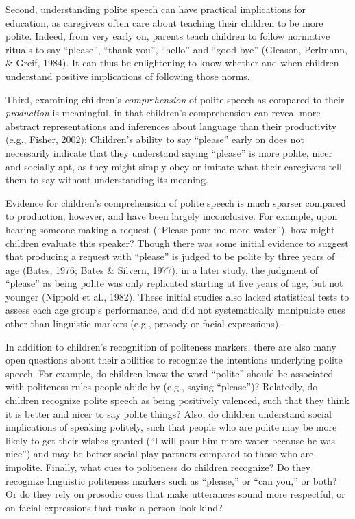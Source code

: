 \documentclass[10pt, letterpaper]{article}
\begin{document}
Second, understanding polite speech can have practical implications for
education, as caregivers often care about teaching their children to be
more polite. Indeed, from very early on, parents teach children to
follow normative rituals to say ``please'', ``thank you'', ``hello'' and
``good-bye'' (Gleason, Perlmann, \& Greif, 1984). It can thus be
enlightening to know whether and when children understand positive
implications of following those norms.

Third, examining children's \emph{comprehension} of polite speech as
compared to their \emph{production} is meaningful, in that children's
comprehension can reveal more abstract representations and inferences
about language than their productivity (e.g., Fisher, 2002): Children's
ability to say ``please'' early on does not necessarily indicate that
they understand saying ``please'' is more polite, nicer and socially
apt, as they might simply obey or imitate what their caregivers tell
them to say without understanding its meaning.

Evidence for children's comprehension of polite speech is much sparser
compared to production, however, and have been largely inconclusive. For
example, upon hearing someone making a request (``Please pour me more
water''), how might children evaluate this speaker? Though there was
some initial evidence to suggest that producing a request with
``please'' is judged to be polite by three years of age (Bates, 1976;
Bates \& Silvern, 1977), in a later study, the judgment of ``please'' as
being polite was only replicated starting at five years of age, but not
younger (Nippold et al., 1982). These initial studies also lacked
statistical tests to assess each age group's performance, and did not
systematically manipulate cues other than linguistic markers (e.g.,
prosody or facial expressions).

In addition to children's recognition of politeness markers, there are
also many open questions about their abilities to recognize the
intentions underlying polite speech. For example, do children know the
word ``polite'' should be associated with politeness rules people abide
by (e.g., saying ``please'')? Relatedly, do children recognize polite
speech as being positively valenced, such that they think it is better
and nicer to say polite things? Also, do children understand social
implications of speaking politely, such that people who are polite may
be more likely to get their wishes granted (``I will pour him more water
because he was nice'') and may be better social play partners compared
to those who are impolite. Finally, what cues to politeness do children
recognize? Do they recognize linguistic politeness markers such as
``please,'' or ``can you,'' or both? Or do they rely on prosodic cues
that make utterances sound more respectful, or on facial expressions
that make a person look kind?
\end{document}
